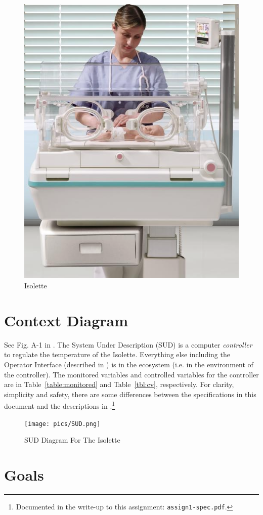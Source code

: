 \documentclass[fontsize=12pt,paper=letter,twoside]{scrartcl}
\begin{document}
\begin{figure}[!htb]
\begin{center}
\includegraphics[width=.4\textwidth]{pics/isolette.png}
\end{center}
\caption{Isolette}
\label{fig:isolette}
\end{figure}

\section{Context Diagram}

See Fig. A-1 in \cite{REMH}. The System Under Description (SUD) is a computer \emph{controller} to regulate the temperature of the Isolette. Everything else including the Operator Interface (described in \cite{REMH}) is in the ecosystem (i.e. in the environment of the controller). The monitored variables and controlled variables for the controller are in Table~\ref{table:monitored} and
Table~\ref{tbl:cv}, respectively. For clarity, simplicity and safety, there are some differences between the specifications in this document and the descriptions in \cite{REMH}.\footnote{%
Documented in the write-up to this assignment: \texttt{assign1-spec.pdf}.}

\begin{figure}[!htb]
\begin{center}
\texttt{[image: pics/SUD.png]}
\end{center}
\caption{SUD Diagram For The Isolette}
\label{fig:isolette_sud}
\end{figure}

\section{Goals}
\end{document}
